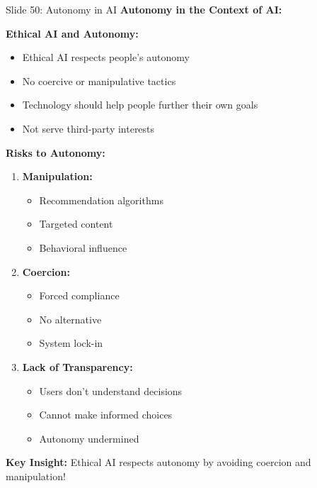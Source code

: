 \documentclass[8pt]{beamer}
\begin{document}
	\begin{frame}{Slide 50: Autonomy in AI}
		\fontsize{6.5}{7.5}\selectfont
		\textbf{Autonomy in the Context of AI:}
		
		\vspace{0.1cm}
		\textbf{Ethical AI and Autonomy:}
		\begin{itemize}
			\item Ethical AI respects people's autonomy
			\item No coercive or manipulative tactics
			\item Technology should help people further their own goals
			\item Not serve third-party interests
		\end{itemize}
		
		\vspace{0.1cm}
		\textbf{Risks to Autonomy:}
		\begin{enumerate}
			\item \textbf{Manipulation:}
			\begin{itemize}
				\item Recommendation algorithms
				\item Targeted content
				\item Behavioral influence
			\end{itemize}
			\item \textbf{Coercion:}
			\begin{itemize}
				\item Forced compliance
				\item No alternative
				\item System lock-in
			\end{itemize}
			\item \textbf{Lack of Transparency:}
			\begin{itemize}
				\item Users don't understand decisions
				\item Cannot make informed choices
				\item Autonomy undermined
			\end{itemize}
		\end{enumerate}
		
		\textcolor{myblue}{\textbf{Key Insight:}} Ethical AI respects \textcolor{myblue}{autonomy by avoiding coercion and manipulation}!
	\end{frame}
	
\end{document}
